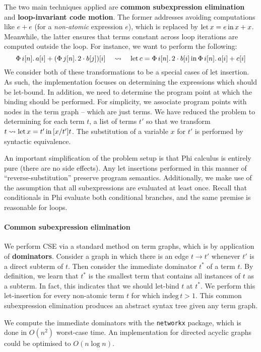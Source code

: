 The two main techniques applied are \textbf{common subexpression elimination} and \textbf{loop-invariant code motion}. The former addresses avoiding computations like $e + e$ (for a \textit{non-atomic} expression $e$), which is replaced by $\mathrm{let}\,{x}={e}\,\mathrm{in}\,{x + x}$. Meanwhile, the latter ensures that terms constant across loop iterations are computed outside the loop. For instance, we want to perform the following:
$$ 
\phivec{i}{n}{a[i] + \left( \phivec{j}{n}{2 \cdot b[j]} \right)[i]} \quad\leadsto\quad \philet{c}{\phivec{i}{n}{2 \cdot b[i]}}{\phivec{i}{n}{a[i] + c[i]}} 
$$
We consider both of these transformations to be a special cases of let insertion. As such, the implementation focuses on determining the expressions which should be let-bound. In addition, we need to determine the program point at which the binding should be performed. For simplicity, we associate program points with nodes in the term graph -- which are just terms. We have reduced the problem to determining for each term $t$, a list of terms $t'$ so that we transform $t \leadsto \mathrm{let}\,{x}={t'}\,\mathrm{in}\,{[x/t']t}$. The substitution of a variable $x$ for $t'$ is performed by syntactic equivalence.

An important simplification of the problem setup is that Phi calculus is entirely pure (there are no side effects). Any let insertions performed in this manner of ``reverse-substitution'' preserve program semantics. Additionally, we make use of the assumption that all subexpressions are evaluated at least once. Recall that conditionals in Phi evaluate both conditional branches, and the same premise is reasonable for loops.

\paragraph{Common subexpression elimination} We perform CSE via a standard method on term graphs, which is by application of \textbf{dominators}. Consider a graph in which there is an edge $t \to t'$ whenever $t'$ is a direct subterm of $t$. Then consider the immediate dominator $t^*$ of a term $t$. By definition, we learn that $t^*$ is the smallest term that contains all instances of $t$ as a subterm. In fact, this indicates that we should let-bind $t$ at $t^*$. We perform this let-insertion for every non-atomic term $t$ for which $\mathrm{indeg}\,t > 1$. This common subexpression elimination produces an abstract syntax tree given any term graph.

We compute the immediate dominators with the \texttt{networkx} package, which is done in $O(n^2)$ worst-case time. An implementation for directed acyclic graphs could be optimised to $O(n \log n)$.

